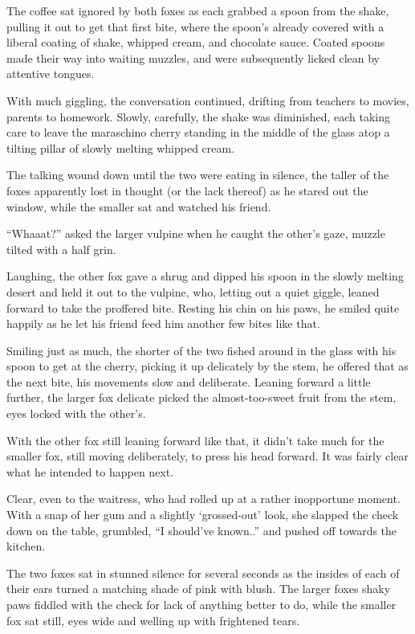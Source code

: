 The coffee sat ignored by both foxes as each grabbed a spoon from the shake, pulling it out to get that first bite, where the spoon's already covered with a liberal coating of shake, whipped cream, and chocolate sauce. Coated spoons made their way into waiting muzzles, and were subsequently licked clean by attentive tongues.

With much giggling, the conversation continued, drifting from teachers to movies, parents to homework. Slowly, carefully, the shake was diminished, each taking care to leave the maraschino cherry standing in the middle of the glass atop a tilting pillar of slowly melting whipped cream.

The talking wound down until the two were eating in silence, the taller of the foxes apparently lost in thought (or the lack thereof) as he stared out the window, while the smaller sat and watched his friend.

``Whaaat?'' asked the larger vulpine when he caught the other's gaze, muzzle tilted with a half grin.

Laughing, the other fox gave a shrug and dipped his spoon in the slowly melting desert and held it out to the vulpine, who, letting out a quiet giggle, leaned forward to take the proffered bite. Resting his chin on his paws, he smiled quite happily as he let his friend feed him another few bites like that.

Smiling just as much, the shorter of the two fished around in the glass with his spoon to get at the cherry, picking it up delicately by the stem, he offered that as the next bite, his movements slow and deliberate. Leaning forward a little further, the larger fox delicate picked the almost-too-sweet fruit from the stem, eyes locked with the other's.

With the other fox still leaning forward like that, it didn't take much for the smaller fox, still moving deliberately, to press his head forward. It was fairly clear what he intended to happen next.

Clear, even to the waitress, who had rolled up at a rather inopportune moment. With a snap of her gum and a slightly `grossed-out' look, she slapped the check down on the table, grumbled, ``I should've known..'' and pushed off towards the kitchen.

The two foxes sat in stunned silence for several seconds as the insides of each of their ears turned a matching shade of pink with blush. The larger foxes shaky paws fiddled with the check for lack of anything better to do, while the smaller fox sat still, eyes wide and welling up with frightened tears.

